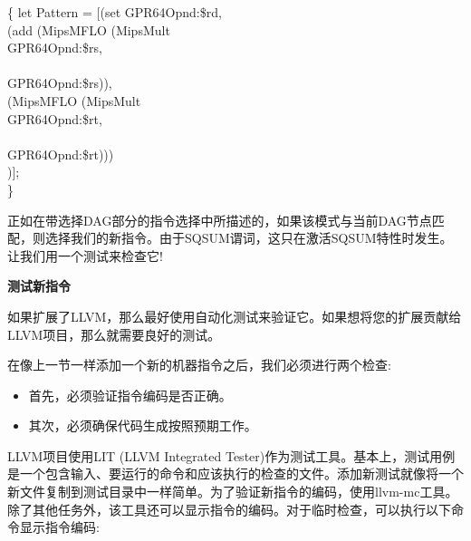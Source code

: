 \begin{tcolorbox}[colback=white,colframe=black]
\{
\hspace*{0.5cm}let Pattern = [(set GPR64Opnd:\$rd, \\
\hspace*{4cm}(add (MipsMFLO (MipsMult \\
\hspace*{4.5cm}GPR64Opnd:\$rs, \\
\\
\hspace*{4.5cm}GPR64Opnd:\$rs)), \\
\hspace*{5.5cm}(MipsMFLO (MipsMult \\
\hspace*{6cm}GPR64Opnd:\$rt, \\
\\
\hspace*{6cm}GPR64Opnd:\$rt))) \\
\hspace*{4.5cm})];\\
\}
\end{tcolorbox}

正如在带选择DAG部分的指令选择中所描述的，如果该模式与当前DAG节点匹配，则选择我们的新指令。由于SQSUM谓词，这只在激活SQSUM特性时发生。让我们用一个测试来检查它!\par

\hspace*{\fill} \par %
\textbf{测试新指令}

如果扩展了LLVM，那么最好使用自动化测试来验证它。如果想将您的扩展贡献给LLVM项目，那么就需要良好的测试。\par

在像上一节一样添加一个新的机器指令之后，我们必须进行两个检查:\par

\begin{itemize}
\item 首先，必须验证指令编码是否正确。
\item 其次，必须确保代码生成按照预期工作。
\end{itemize}

LLVM项目使用LIT (LLVM Integrated Tester)作为测试工具。基本上，测试用例是一个包含输入、要运行的命令和应该执行的检查的文件。添加新测试就像将一个新文件复制到测试目录中一样简单。为了验证新指令的编码，使用llvm-mc工具。除了其他任务外，该工具还可以显示指令的编码。对于临时检查，可以执行以下命令显示指令编码:\par

